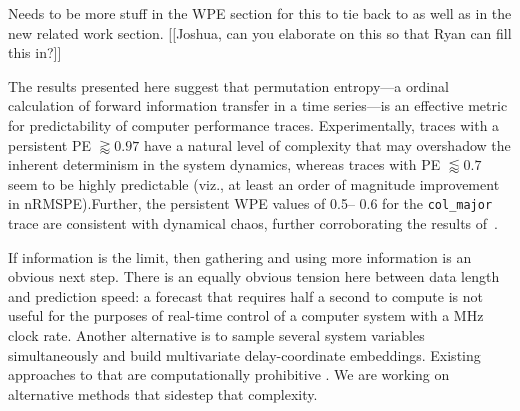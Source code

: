 Needs to be more stuff in the WPE section for this to tie back to as
well as in the new related work section.  [[Joshua, can you elaborate
    on this so that Ryan can fill this in?]]

The results presented here suggest that permutation entropy---a ordinal
calculation of forward information transfer in a time series---is an effective
metric for predictability of computer performance traces. Experimentally, traces
with a persistent PE $\gtrapprox 0.97$ have a natural level of complexity that
may overshadow the inherent determinism in the system dynamics, whereas traces
with PE $\lessapprox 0.7$ seem to be highly predictable (viz., at least an order
of magnitude improvement in nRMSPE).Further, the persistent WPE values of 0.5--
0.6 for the {\tt col\_major} trace are consistent with dynamical chaos, further
corroborating the results of~\cite{mytkowicz09}.

If information is the limit, then gathering and using more information is an
obvious next step.  There is an equally obvious tension here between data length
and prediction speed: a forecast that requires half a second to compute is not
useful for the purposes of real-time control of a computer system with a MHz
clock rate.  Another alternative is to sample several system variables
simultaneously and build multivariate delay-coordinate embeddings.  Existing
approaches to that are computationally prohibitive
\cite{cao-multivariate-embedding}.  We are working on alternative
methods that sidestep that complexity.





